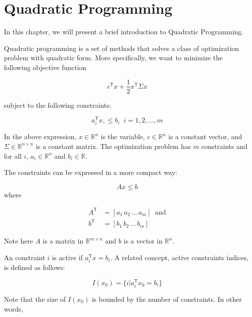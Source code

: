 \documentclass[letterpaper, oneside]{book}
\theoremstyle{definition}
\theoremstyle{remark}
\theoremstyle{theorem}
\begin{document}
\chapter{Quadratic Programming}

In this chapter, we will present a brief introduction to Quadratic Programming.

Quadratic programming is a set of methods that solves a class of optimization problem with quadratic form. More specifically, we want to minimize the following objective function

\begin{displaymath}
	c^{\mathsf{T}}x + \frac{1}{2}x^{\mathsf{T}} \Sigma x
\end{displaymath}

subject to the following constraints:

\begin{displaymath}
	a_i^{\mathsf{T}}x, \leq b_i\;\;i=1,2,...,m
\end{displaymath}

In the above expression, $x \in \mathbb{R}^n$ is the variable, $c \in \mathbb{R}^n$ is a constant vector, and $\Sigma \in \mathbb{R}^{n\times n}$ is a constant matrix. The optimization problem has $m$ constraints and for all $i$, $a_i \in \mathbb{R}^n$ and $b_i \in \mathbb{R}$.

The constraints can be expressed in a more compact way:

\begin{displaymath}
	Ax \leq b
\end{displaymath}
where 

\begin{align*}
	A^{\mathsf{T}} & = [a_1 \, a_2 \, ... \, a_m] \;\; \textrm{and} \\
	b^{\mathsf{T}} & = [b_1 \, b_2 \, ... \, b_m]
\end{align*}

Note here $A$ is a matrix in $\mathbb{R}^{m \times n}$ and $b$ is a vector in $\mathbb{R}^n$.

An constraint $i$ is active if $a_i^{\mathsf{T}}x = b_i$. A related concept, active constraints indices, is defined as follows:

\begin{displaymath}
	I(x_0) = \{i | a_i^{\mathsf{T}}x_0=b_i\}
\end{displaymath}

Note that the size of $I(x_0)$ is bounded by the number of constraints. In other words,
\end{document}
